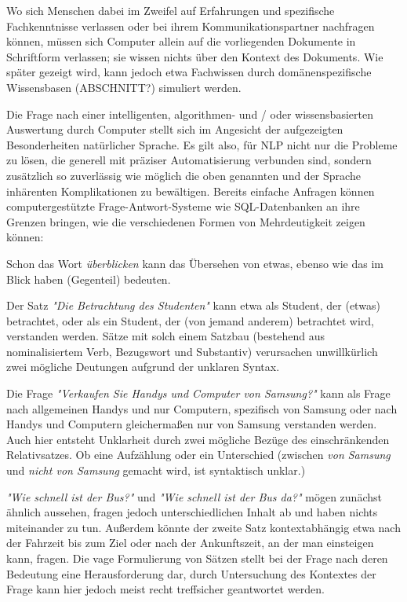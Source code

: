 \documentclass[12pt]{paper}
\begin{document}
Wo sich Menschen dabei im Zweifel auf Erfahrungen und spezifische Fachkenntnisse verlassen oder bei ihrem Kommunikationspartner nachfragen können, müssen sich Computer allein auf die vorliegenden Dokumente in Schriftform verlassen; sie wissen nichts über den Kontext des Dokuments. Wie später gezeigt wird, kann jedoch etwa Fachwissen durch domänenspezifische Wissensbasen (ABSCHNITT?) simuliert werden. 

Die Frage nach einer intelligenten, algorithmen- und / oder wissensbasierten Auswertung durch Computer stellt sich im Angesicht der aufgezeigten Besonderheiten natürlicher Sprache. Es gilt also, für NLP nicht nur die Probleme zu lösen, die generell mit präziser Automatisierung verbunden sind, sondern zusätzlich so zuverlässig wie möglich die oben genannten und der Sprache inhärenten Komplikationen zu bewältigen. 
Bereits einfache Anfragen können computergestützte Frage-Antwort-Systeme wie SQL-Datenbanken an ihre Grenzen bringen, wie die verschiedenen Formen von Mehrdeutigkeit zeigen können:

Schon das Wort \textit{überblicken} kann das Übersehen von etwas, ebenso wie das im Blick haben (Gegenteil) bedeuten.

Der Satz \textit{"Die Betrachtung des Studenten"} kann etwa als Student, der (etwas) betrachtet, oder als ein Student, der (von jemand anderem) betrachtet wird, verstanden werden. Sätze mit solch einem Satzbau (bestehend aus nominalisiertem Verb, Bezugswort und Substantiv) verursachen unwillkürlich zwei mögliche Deutungen aufgrund der unklaren Syntax.

Die Frage \textit{"Verkaufen Sie Handys und Computer von Samsung?"} kann als Frage nach allgemeinen Handys und nur Computern, spezifisch von Samsung oder nach Handys und Computern gleichermaßen nur von Samsung verstanden werden. Auch hier entsteht Unklarheit durch zwei mögliche Bezüge des einschränkenden Relativsatzes. Ob eine Aufzählung oder ein Unterschied (zwischen \textit{von Samsung} und \textit{nicht von Samsung} gemacht wird, ist syntaktisch unklar.)

\textit{"Wie schnell ist der Bus?"} und \textit{"Wie schnell ist der Bus da?"} mögen zunächst ähnlich aussehen, fragen jedoch unterschiedlichen Inhalt ab und haben nichts miteinander zu tun. Außerdem könnte der zweite Satz kontextabhängig etwa nach der Fahrzeit bis zum Ziel oder nach der Ankunftszeit, an der man einsteigen kann, fragen. Die vage Formulierung von Sätzen stellt bei der Frage nach deren Bedeutung eine Herausforderung dar, durch Untersuchung des Kontextes der Frage kann hier jedoch meist recht treffsicher geantwortet werden.
\end{document}
